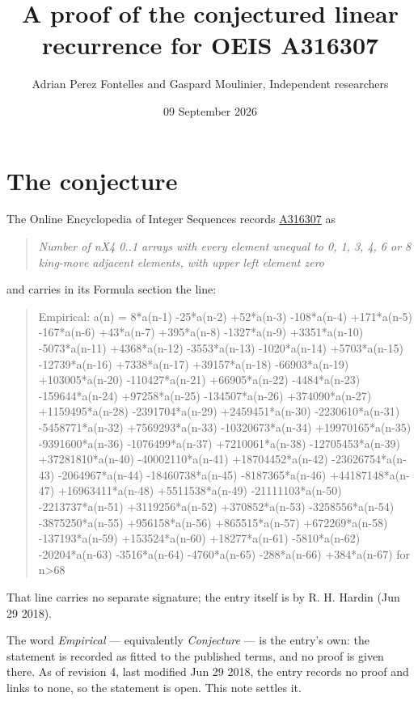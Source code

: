 \documentclass[11pt]{article}
\title{A proof of the conjectured linear recurrence for OEIS A316307}
\author{Adrian Perez Fontelles and Gaspard Moulinier, Independent researchers}
\date{09 September 2026}
\theoremstyle{definition}
\begin{document}
\maketitle
\section{The conjecture}

The Online Encyclopedia of Integer Sequences records \href{https://oeis.org/A316307}{A316307} as

\begin{quote}\itshape Number of nX4 0..1 arrays with every element unequal to 0, 1, 3, 4, 6 or 8 king-move adjacent elements, with upper left element zero\end{quote}

and carries in its Formula section the line:

\begin{quote}\ttfamily Empirical: a(n) = 8*a(n-1) -25*a(n-2) +52*a(n-3) -108*a(n-4) +171*a(n-5) -167*a(n-6) +43*a(n-7) +395*a(n-8) -1327*a(n-9) +3351*a(n-10) -5073*a(n-11) +4368*a(n-12) -3553*a(n-13) -1020*a(n-14) +5703*a(n-15) -12739*a(n-16) +7338*a(n-17) +39157*a(n-18) -66903*a(n-19) +103005*a(n-20) -110427*a(n-21) +66905*a(n-22) -4484*a(n-23) -159644*a(n-24) +97258*a(n-25) -134507*a(n-26) +374090*a(n-27) +1159495*a(n-28) -2391704*a(n-29) +2459451*a(n-30) -2230610*a(n-31) -5458771*a(n-32) +7569293*a(n-33) -10320673*a(n-34) +19970165*a(n-35) -9391600*a(n-36) -1076499*a(n-37) +7210061*a(n-38) -12705453*a(n-39) +37281810*a(n-40) -40002110*a(n-41) +18704452*a(n-42) -23626754*a(n-43) -2064967*a(n-44) -18460738*a(n-45) -8187365*a(n-46) +44187148*a(n-47) +16963411*a(n-48) +5511538*a(n-49) -21111103*a(n-50) -2213737*a(n-51) +3119256*a(n-52) +370852*a(n-53) -3258556*a(n-54) -3875250*a(n-55) +956158*a(n-56) +865515*a(n-57) +672269*a(n-58) -137193*a(n-59) +153524*a(n-60) +18277*a(n-61) -5810*a(n-62) -20204*a(n-63) -3516*a(n-64) -4760*a(n-65) -288*a(n-66) +384*a(n-67) for n>68\end{quote}

That line carries no separate signature; the entry itself is by R. H. Hardin (Jun 29 2018).

The word {\itshape Empirical} --- equivalently {\itshape Conjecture} --- is the entry's own: the statement is recorded as fitted to the published terms, and no proof is given there. As of revision 4, last modified Jun 29 2018, the entry records no proof and links to none, so the statement is open. This note settles it.
\end{document}
